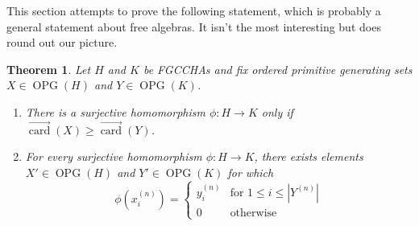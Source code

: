 \documentclass[11pt]{amsart}
\newtheorem{thm}{Theorem}
\theoremstyle{definition}
\numberwithin{equation}{section}
\newcommand{\FGCCHAs}{\textsf{FGCCHA}s\xspace}
\newcommand{\veccard}{\overrightarrow{\operatorname{card}}}
\newcommand{\OPG}{\operatorname{OPG}}
\begin{document}
This section attempts to prove the following statement, which is probably a general statement about free algebras.  It isn't the most interesting but does round out our picture.

\begin{thm}
Let $H$ and $K$ be \FGCCHAs and fix ordered primitive generating sets $X \in \OPG(H)$ and $Y \in \OPG(K)$.
\begin{enumerate}
\item There is a surjective homomorphism $\phi: H \to K$ only if $\veccard(X) \ge \veccard(Y)$.

\item For every surjective homomorphism $\phi: H \to K$, there exists elements $X' \in \OPG(H)$ and $Y' \in \OPG(K)$ for which
\[
\phi(x_{i}^{(n)}) = \begin{cases} y_{i}^{(n)} & \text{for $1 \le i \le |Y^{(n)}|$} \\ 0 & \text{otherwise} \end{cases}
\]

\end{enumerate}
\end{thm}
\end{document}
